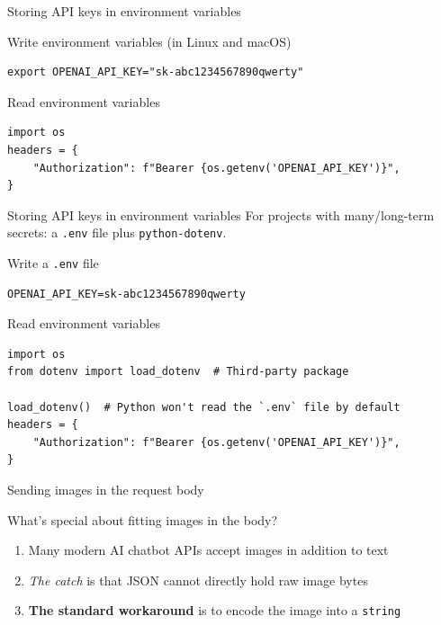 \documentclass[aspectratio=169]{beamer}
\begin{document}
\begin{frame}[fragile]{Storing API keys in environment variables}
  \begin{block}{Write environment variables (in Linux and macOS)}
        \begin{verbatim}
export OPENAI_API_KEY="sk-abc1234567890qwerty"
        \end{verbatim}
    \end{block}

    \begin{block}{Read environment variables}
        \begin{verbatim}
import os
headers = {
    "Authorization": f"Bearer {os.getenv('OPENAI_API_KEY')}",
}
        \end{verbatim}
    \end{block}
\note{
}
\end{frame}


\begin{frame}[fragile]{Storing API keys in environment variables}
  For projects with many/long-term secrets: a \texttt{.env} file plus \texttt{python-dotenv}.
  \begin{block}{Write a \texttt{.env} file}
        \begin{verbatim}
OPENAI_API_KEY=sk-abc1234567890qwerty
        \end{verbatim}
    \end{block}

    \begin{block}{Read environment variables}
        \begin{verbatim}
import os
from dotenv import load_dotenv  # Third-party package

load_dotenv()  # Python won't read the `.env` file by default
headers = {
    "Authorization": f"Bearer {os.getenv('OPENAI_API_KEY')}",
}
        \end{verbatim}
    \end{block}

\note{
}
\end{frame}


\begin{frame}[fragile]{Sending images in the request body}
    \begin{block}{What's special about fitting images in the body?}
\begin{enumerate}
\item Many modern AI chatbot APIs accept images in addition to text
\item \textit{The catch} is that JSON cannot directly hold raw image bytes
\item \textbf{The standard workaround} is to encode the image into a \texttt{string}
\end{enumerate}
    \end{block}
\note{
}
\end{frame}
\end{document}
